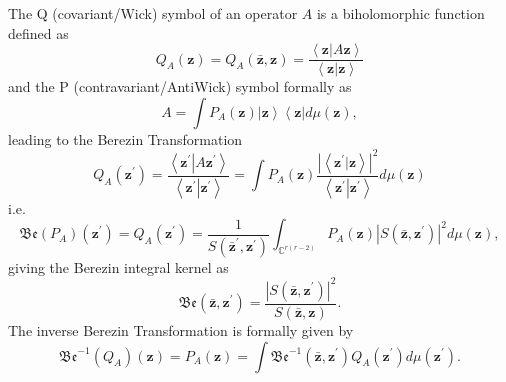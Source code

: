 \documentclass[aps,preprint]{revtex4}%
\begin{document}
The Q (covariant/Wick) symbol of an operator $A$ is a biholomorphic function
defined as
\begin{equation}
Q_{A}\left(  \mathbf{z}\right)  =Q_{A}\left(  \mathbf{\bar{z}},\mathbf{z}%
\right)  =\frac{\left\langle \mathbf{z}\left\vert A\mathbf{z}\right.
\right\rangle }{\left\langle \mathbf{z}\left\vert \mathbf{z}\right.
\right\rangle }%
\end{equation}
and the P (contravariant/AntiWick) symbol formally as
\begin{equation}
A=\int P_{A}\left(  \mathbf{z}\right)  \left\vert \mathbf{z}\right\rangle
\left\langle \mathbf{z}\right\vert d\mu\left(  \mathbf{z}\right)  ,
\end{equation}
leading to the Berezin Transformation
\begin{equation}
Q_{A}\left(  \mathbf{z}^{\prime}\right)  =\frac{\left\langle \mathbf{z}%
^{\prime}\left\vert A\mathbf{z}^{\prime}\right.  \right\rangle }{\left\langle
\mathbf{z}^{\prime}\left\vert \mathbf{z}^{\prime}\right.  \right\rangle }=\int
P_{A}\left(  \mathbf{z}\right)  \frac{\left\vert \left\langle \mathbf{z}%
^{\prime}\left\vert \mathbf{z}\right.  \right\rangle \right\vert ^{2}%
}{\left\langle \mathbf{z}^{\prime}\left\vert \mathbf{z}^{\prime}\right.
\right\rangle }d\mu\left(  \mathbf{z}\right)
\end{equation}
i.e.
\begin{equation}
\mathfrak{Be}\left(  P_{A}\right)  \left(  \mathbf{z}^{\prime}\right)
=Q_{A}\left(  \mathbf{z}^{\prime}\right)  =\frac{1}{S\left(  \mathbf{\bar{z}%
}^{\prime}\mathbf{,z}^{\prime}\right)  }\int_{\mathbb{C}^{r\left(  r-2\right)
}}P_{A}\left(  \mathbf{z}\right)  \left\vert S\left(  \mathbf{\bar{z}%
,z}^{\prime}\right)  \right\vert ^{2}d\mu\left(  \mathbf{z}\right)  ,
\end{equation}
giving the Berezin integral kernel as
\begin{equation}
\mathfrak{Be}\left(  \mathbf{\bar{z},z}^{\prime}\right)  =\frac{\left\vert
S\left(  \mathbf{\bar{z},z}^{\prime}\right)  \right\vert ^{2}}{S\left(
\mathbf{\bar{z},z}\right)  }.
\end{equation}
The inverse Berezin Transformation is formally given by
\begin{equation}
\mathfrak{Be}^{-1}\left(  Q_{A}\right)  \left(  \mathbf{z}\right)
=P_{A}\left(  \mathbf{z}\right)  =\int\mathfrak{Be}^{-1}\left(  \mathbf{\bar
{z},z}^{\prime}\right)  Q_{A}\left(  \mathbf{z}^{\prime}\right)  d\mu\left(
\mathbf{z}^{\prime}\right)  .
\end{equation}
\end{document}
